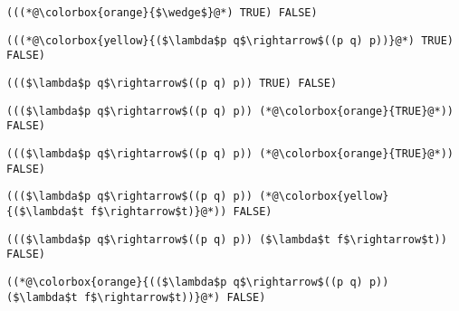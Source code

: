 \documentclass{beamer}
\begin{document}
\begin{frame}[fragile]{\CurrentSection}
\lstset{basicstyle=\ttfamily\small}\lstset{numbers=none}\lstset{language=ML}\begin{lstlisting}
(((*@\colorbox{orange}{$\wedge$}@*) TRUE) FALSE)
\end{lstlisting}
\pause\lstset{language=ML}\begin{lstlisting}
(((*@\colorbox{yellow}{($\lambda$p q$\rightarrow$((p q) p))}@*) TRUE) FALSE)
\end{lstlisting}

\end{frame}

\begin{frame}[fragile]{\CurrentSection}
\lstset{basicstyle=\ttfamily\small}\lstset{numbers=none}\lstset{language=ML}\begin{lstlisting}
((($\lambda$p q$\rightarrow$((p q) p)) TRUE) FALSE)
\end{lstlisting}
\pause\lstset{language=ML}\begin{lstlisting}
((($\lambda$p q$\rightarrow$((p q) p)) (*@\colorbox{orange}{TRUE}@*)) FALSE)
\end{lstlisting}

\end{frame}

\begin{frame}[fragile]{\CurrentSection}
\lstset{basicstyle=\ttfamily\small}\lstset{numbers=none}\lstset{language=ML}\begin{lstlisting}
((($\lambda$p q$\rightarrow$((p q) p)) (*@\colorbox{orange}{TRUE}@*)) FALSE)
\end{lstlisting}
\pause\lstset{language=ML}\begin{lstlisting}
((($\lambda$p q$\rightarrow$((p q) p)) (*@\colorbox{yellow}{($\lambda$t f$\rightarrow$t)}@*)) FALSE)
\end{lstlisting}

\end{frame}

\begin{frame}[fragile]{\CurrentSection}
\lstset{basicstyle=\ttfamily\small}\lstset{numbers=none}\lstset{language=ML}\begin{lstlisting}
((($\lambda$p q$\rightarrow$((p q) p)) ($\lambda$t f$\rightarrow$t)) FALSE)
\end{lstlisting}
\pause\lstset{language=ML}\begin{lstlisting}
((*@\colorbox{orange}{(($\lambda$p q$\rightarrow$((p q) p)) ($\lambda$t f$\rightarrow$t))}@*) FALSE)
\end{lstlisting}

\end{frame}
\end{document}
